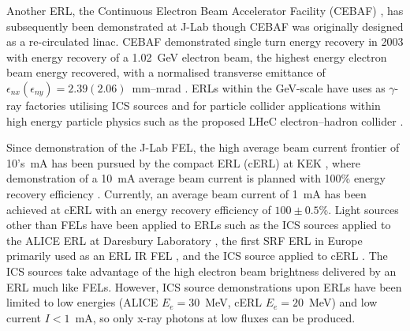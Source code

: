 \documentclass[../main.tex]{subfiles}
\begin{document}
Another ERL, the Continuous Electron Beam Accelerator Facility (CEBAF) \cite{bogacz2003cebaf,tennant2003beam}, has subsequently been demonstrated at J-Lab though CEBAF was originally designed as a re-circulated linac. CEBAF demonstrated single turn energy recovery in 2003 \cite{bogacz2003cebaf,tennant2003beam} with energy recovery of a 1.02~\si{\giga\electronvolt} electron beam, the highest energy electron beam energy recovered, with a normalised transverse emittance of $\epsilon_{nx} \left(\epsilon_{ny}\right) = 2.39 \left(2.06\right)$~\si{\milli\meter}--\si{\milli\radian} \cite{tennant2003beam}. ERLs within the \si{\giga\electronvolt}-scale have uses as $\gamma$-ray factories \cite{budker2021expanding} utilising ICS sources and for particle collider applications within high energy particle physics such as the proposed LHeC electron--hadron collider \cite{agostini2021large}. 



Since demonstration of the J-Lab FEL, the high average beam current frontier of 10's~\si{\milli\ampere} has been pursued by the compact ERL (cERL) at KEK \cite{akagi2016narrow}, where demonstration of a 10~\si{\milli\ampere} average beam current is planned with 100\% energy recovery efficiency \cite{adolphsen2022european}. Currently, an average beam current of 1~\si{\milli\ampere} has been achieved at cERL \cite{obina20191} with an energy recovery efficiency of $100\pm 0.5$\%. Light sources other than FELs have been applied to ERLs such as the 
ICS sources applied to the ALICE ERL at Daresbury Laboratory \cite{priebe2008inverse,priebe2010first}, the first SRF ERL in Europe primarily used as an ERL IR FEL \cite{thompson2014status}, and the ICS source applied to cERL \cite{akagi2016narrow}. The ICS sources take advantage of the high electron beam brightness delivered by an ERL much like FELs. However, ICS source demonstrations upon ERLs have been limited to low energies (ALICE $E_{e}=30$~\si{\mega\electronvolt}, cERL  $E_{e}=20$~\si{\mega\electronvolt}) and low current $I < 1$~\si{\milli\ampere}, so only x-ray photons at low fluxes can be produced. 
\end{document}
